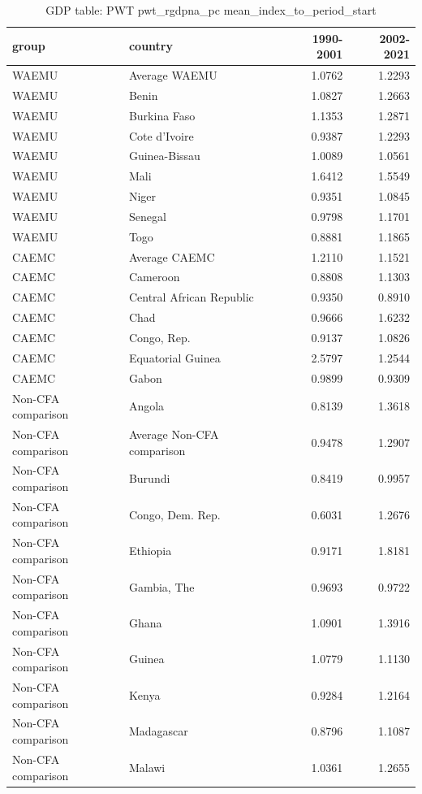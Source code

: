 \begin{table}

\caption{GDP table: PWT pwt_rgdpna_pc mean_index_to_period_start}
\centering
\begin{tabular}[t]{llrr}
\toprule
group & country & 1990-2001 & 2002-2021\\
\midrule
WAEMU & Average WAEMU & 1.0762 & 1.2293\\
WAEMU & Benin & 1.0827 & 1.2663\\
WAEMU & Burkina Faso & 1.1353 & 1.2871\\
WAEMU & Cote d'Ivoire & 0.9387 & 1.2293\\
WAEMU & Guinea-Bissau & 1.0089 & 1.0561\\
\addlinespace
WAEMU & Mali & 1.6412 & 1.5549\\
WAEMU & Niger & 0.9351 & 1.0845\\
WAEMU & Senegal & 0.9798 & 1.1701\\
WAEMU & Togo & 0.8881 & 1.1865\\
CAEMC & Average CAEMC & 1.2110 & 1.1521\\
\addlinespace
CAEMC & Cameroon & 0.8808 & 1.1303\\
CAEMC & Central African Republic & 0.9350 & 0.8910\\
CAEMC & Chad & 0.9666 & 1.6232\\
CAEMC & Congo, Rep. & 0.9137 & 1.0826\\
CAEMC & Equatorial Guinea & 2.5797 & 1.2544\\
\addlinespace
CAEMC & Gabon & 0.9899 & 0.9309\\
Non-CFA comparison & Angola & 0.8139 & 1.3618\\
Non-CFA comparison & Average Non-CFA comparison & 0.9478 & 1.2907\\
Non-CFA comparison & Burundi & 0.8419 & 0.9957\\
Non-CFA comparison & Congo, Dem. Rep. & 0.6031 & 1.2676\\
\addlinespace
Non-CFA comparison & Ethiopia & 0.9171 & 1.8181\\
Non-CFA comparison & Gambia, The & 0.9693 & 0.9722\\
Non-CFA comparison & Ghana & 1.0901 & 1.3916\\
Non-CFA comparison & Guinea & 1.0779 & 1.1130\\
Non-CFA comparison & Kenya & 0.9284 & 1.2164\\
\addlinespace
Non-CFA comparison & Madagascar & 0.8796 & 1.1087\\
Non-CFA comparison & Malawi & 1.0361 & 1.2655\\

\end{tabular}
\end{table}
